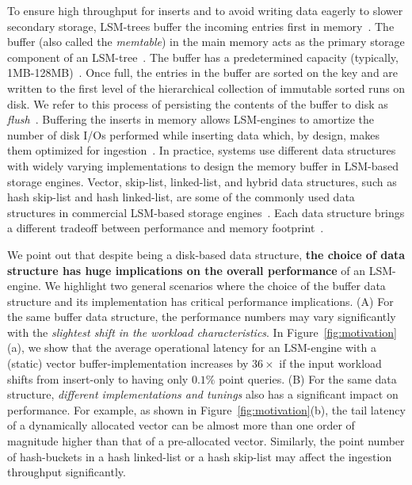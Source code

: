 To ensure high throughput for inserts and to avoid writing data eagerly to slower secondary storage, LSM-trees buffer the incoming entries first in memory~\cite{Luo2019c,Sarkar2022a}. 
The buffer (also called the \textit{memtable}) in the main memory acts as the primary storage component of an LSM-tree~\cite{ONeil1996}. 
The buffer has a predetermined capacity (typically, 1MB-128MB)~\cite{Cao2020,Dong2017}. 
Once full, the entries in the buffer are sorted on the key and are written to the first level of the hierarchical collection of immutable sorted runs on disk. 
We refer to this process of persisting the contents of the buffer to disk as \textit{flush}~\cite{Sarkar2022b}. 
Buffering the inserts in memory allows LSM-engines to amortize the number of disk I/Os performed while inserting data which, by design, makes them optimized for ingestion~\cite{Sarkar2021c}. 
In practice, systems use different data structures with widely varying implementations to design the memory buffer in LSM-based storage engines. 
Vector, skip-list, linked-list, and hybrid data structures, such as hash skip-list and hash linked-list, are some of the commonly used data structures in commercial LSM-based storage engines~\cite{Dong2021a,Facebook2021}.
Each data structure brings a different tradeoff between performance and memory footprint~\cite{Athanassoulis2016}. 



We point out that despite being a disk-based data structure, \textbf{the choice of data structure has huge implications on the overall performance} of an LSM-engine. 
We highlight two general scenarios where the choice of the buffer data structure and its implementation has critical performance implications. 
(A) For the same buffer data structure, the performance numbers may vary significantly with the \textit{slightest shift in the workload characteristics}. 
In Figure~\ref{fig:motivation}(a), we show that the average operational latency for an LSM-engine with a (static) vector buffer-implementation increases by $36\times$ if the input workload shifts from insert-only to having only $0.1\%$ point queries. 
(B) For the same data structure, \textit{different implementations and tunings} also has a significant impact on performance. 
For example, as shown in Figure~\ref{fig:motivation}(b), the tail latency of a dynamically allocated vector can be almost more than one order of magnitude higher than that of a pre-allocated vector. 
Similarly, the point number of hash-buckets in a hash linked-list or a hash skip-list may affect the ingestion throughput significantly. 

